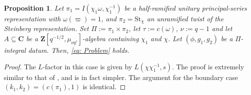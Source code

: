 \documentclass{amsart}
\theoremstyle{plain}
\newtheorem{prop}[thm]{Proposition}
\theoremstyle{plain}
\theoremstyle{remark}
\begin{document}
\begin{prop}
    Let $\pi_1=I(\chi_1\omega,\chi_1^{-1})$ be a half-ramified unitary principal-series representation with $\omega(\varpi)=1$, and $\pi_2=\mathrm{St}_\chi$ an unramified twist of the Steinberg representation. Set $\Pi:=\pi_1\times \pi_2$, let $\tau:=c(\omega)$, $\nu:=q-1$ and let $A\subseteq \mathbf{C}$ be a $\mathbf{Z}[q^{-1/2},\mu_{\nu q^\tau}]$-algebra containing $\chi_1$ and $\chi$. Let $(\phi,g_1,g_2)$ be a $\Pi$-integral datum. Then, \eqref{eq: Problem} holds.
\end{prop}
\begin{proof}
    The $L$-factor in this case is given by $L(\chi\chi_1^{-1},s)$. The proof is extremely similar to that of , and is in fact simpler. The argument for the boundary case $(k_1,k_2)=(c(\pi_1),1)$ is identical.
\end{proof}
\end{document}
